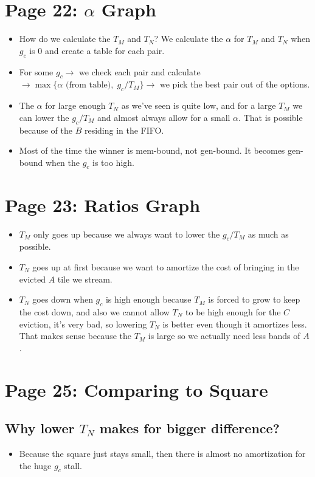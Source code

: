 \documentclass[11pt, a4paper]{article}
\begin{document}
\section*{Page 22: $\alpha$ Graph}
\begin{itemize}
    \item How do we calculate the $T_M$ and $T_N$? We calculate the $\alpha$ for $T_M$ and $T_N$ when $g_c$ is 0 and create a table for each pair.
    \item For some $g_c \to$ we check each pair and calculate $\to \max\{\alpha \text{ (from table)},\; g_c / T_M\} \to$ we pick the best pair out of the options.
    \item The $\alpha$ for large enough $T_N$ as we've seen is quite low, and for a large $T_M$ we can lower the $g_c / T_M$ and almost always allow for a small $\alpha$. That is possible because of the $B$ residing in the FIFO.
    \item Most of the time the winner is mem-bound, not gen-bound. It becomes gen-bound when the $g_c$ is too high.
\end{itemize}

\section*{Page 23: Ratios Graph}
\begin{itemize}
    \item $T_M$ only goes up because we always want to lower the $g_c / T_M$ as much as possible.
    \item $T_N$ goes up at first because we want to amortize the cost of bringing in the evicted $A$ tile we stream.
    \item $T_N$ goes down when $g_c$ is high enough because $T_M$ is forced to grow to keep the cost down, and also we cannot allow $T_N$ to be high enough for the $C$ eviction, it's very bad, so lowering $T_N$ is better even though it amortizes less. That makes sense because the $T_M$ is large so we actually need less bands of $A$.
\end{itemize}

\section*{Page 25: Comparing to Square}

\subsection*{Why lower $T_N$ makes for bigger difference?}
\begin{itemize}
    \item Because the square just stays small, then there is almost no amortization for the huge $g_c$ stall.
\end{itemize}
\end{document}
